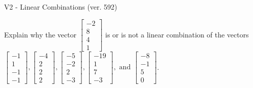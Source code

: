 \begin{exercise}
  \begin{exerciseTitle}V2 - Linear Combinations (ver. 592)\end{exerciseTitle}
  \begin{exerciseStatement}
    Explain why the vector \(\left[\begin{array}{c}
-2 \\
8 \\
4 \\
1
\end{array}\right]\)  is or is not a linear 
	combination of the vectors \(\left[\begin{array}{c}
-1 \\
1 \\
-1 \\
-1
\end{array}\right] , \left[\begin{array}{c}
-4 \\
2 \\
2 \\
2
\end{array}\right] , \left[\begin{array}{c}
-5 \\
-2 \\
2 \\
-3
\end{array}\right] , \left[\begin{array}{c}
-19 \\
1 \\
7 \\
-3
\end{array}\right] , \text{ and } \left[\begin{array}{c}
-8 \\
-1 \\
5 \\
0
\end{array}\right]\).
	



\end{exerciseStatement}
\end{exercise}
